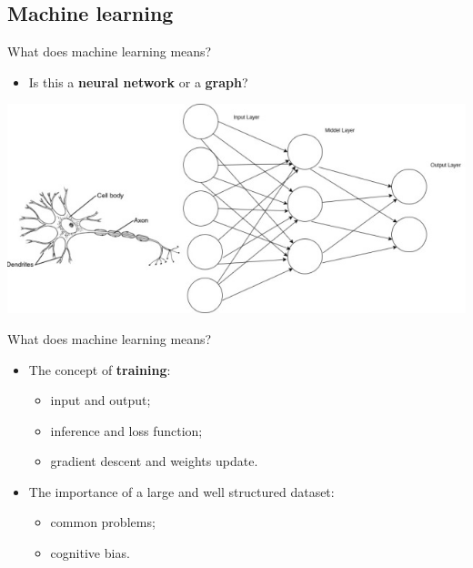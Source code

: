 \documentclass{beamer}
\begin{document}
\subsection{Machine learning}

\begin{frame}{What does machine learning means?}
	\begin{itemize}
		[triangle]
  		\item
    			Is this a \textbf{neural network} or a \textbf{graph}?
	\end{itemize}
	\begin{center}
		\includegraphics[scale=0.5]{neuralNet}
	\end{center}
\end{frame}

\begin{frame}{What does machine learning means?}
	\begin{itemize}
		\setlength\itemsep{1em}
		[triangle]
  		\item 
			The concept of \textbf{training}:
    			\begin{itemize}
				[circle]
    				\item
      					input and output;
    				\item    
      					inference and loss function;
   				\item
					gradient descent and weights update.
			\end{itemize}
		\item
    			The importance of a large and well structured dataset:
    			\begin{itemize}
				[circle]
   				\item 
					common problems;
    				\item 
					cognitive bias.
    			\end{itemize}
 	 \end{itemize}
\end{frame}
\end{document}

